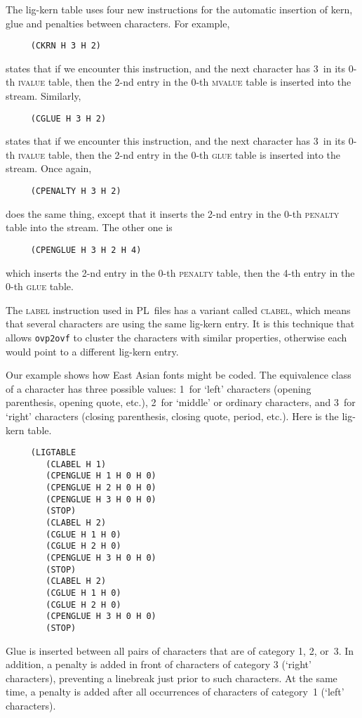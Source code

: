 \documentclass[fleqn]{article}
\newcommand{\PL}{PL}
\begin{document}
The lig-kern table uses four new instructions for the automatic
insertion of kern, glue and penalties between characters.  For example,
\begin{verbatim}
     (CKRN H 3 H 2)
\end{verbatim}
states that if we encounter this instruction, and the next character
has 3~in its 0-th \textsc{ivalue} table, then the 2-nd entry in the 0-th
\textsc{mvalue} table is inserted into the stream.
Similarly,
\begin{verbatim}
     (CGLUE H 3 H 2)
\end{verbatim}
states that if we encounter this instruction, and the next character
has 3~in its 0-th \textsc{ivalue} table, then the 2-nd entry in the 0-th
\textsc{glue} table is inserted into the stream.
Once again,
\begin{verbatim}
     (CPENALTY H 3 H 2)
\end{verbatim}
does the same thing, except that it inserts the 2-nd entry in the 0-th
\textsc{penalty} table into the stream.  The other one is
\begin{verbatim}
     (CPENGLUE H 3 H 2 H 4)
\end{verbatim}
which inserts the 2-nd entry in the 0-th \textsc{penalty} table, then
the 4-th entry in the 0-th \textsc{glue} table.

The \textsc{label} instruction used in \PL\ files has a variant called
\textsc{clabel}, which means that several characters are using the same
lig-kern entry.  It is this technique that allows \texttt{ovp2ovf}
to cluster the characters with similar properties, otherwise each would
point to a different lig-kern entry.

Our example shows how East Asian fonts might be coded.  The
equivalence class of a character has three possible values: 1~for
`left' characters (opening parenthesis, opening quote, etc.),
2~for `middle' or ordinary characters,
and 3~for `right' characters
(closing parenthesis, closing quote, period, etc.).
Here is the lig-kern table.
\begin{verbatim}
     (LIGTABLE
        (CLABEL H 1)
        (CPENGLUE H 1 H 0 H 0)
        (CPENGLUE H 2 H 0 H 0)
        (CPENGLUE H 3 H 0 H 0)
        (STOP)
        (CLABEL H 2)
        (CGLUE H 1 H 0)
        (CGLUE H 2 H 0)
        (CPENGLUE H 3 H 0 H 0)
        (STOP)
        (CLABEL H 2)
        (CGLUE H 1 H 0)
        (CGLUE H 2 H 0)
        (CPENGLUE H 3 H 0 H 0)
        (STOP)
\end{verbatim}
Glue is inserted between all pairs of characters that are of category 1,
2, or~3.  In addition, a penalty is added in front of characters of
category 3 (`right' characters), preventing a linebreak just prior to
such characters.  At the same time, a penalty is added after all
occurrences of characters of category~1 (`left' characters).
\end{document}
